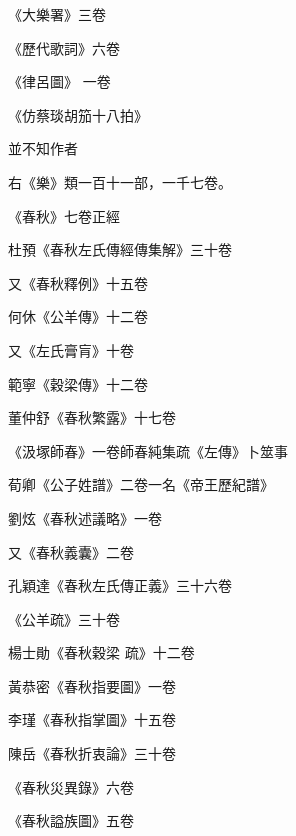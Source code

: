 \begin{pinyinscope}
 《大樂署》三卷



 《歷代歌詞》六卷



 《律呂圖》
 一卷



 《仿蔡琰胡笳十八拍》



 並不知作者



 右《樂》類一百十一部，一千七卷。



 《春秋》七卷正經



 杜預《春秋左氏傳經傳集解》三十卷



 又《春秋釋例》十五卷



 何休《公羊傳》十二卷



 又《左氏膏肓》十卷



 範寧《穀梁傳》十二卷



 董仲舒《春秋繁露》十七卷



 《汲塚師春》一卷師春純集疏《左傳》卜筮事



 荀卿《公子姓譜》二卷一名《帝王歷紀譜》



 劉炫《春秋述議略》一卷



 又《春秋義囊》二卷



 孔穎達《春秋左氏傳正義》三十六卷



 《公羊疏》三十卷



 楊士勛《春秋穀梁
 疏》十二卷



 黃恭密《春秋指要圖》一卷



 李瑾《春秋指掌圖》十五卷



 陳岳《春秋折衷論》三十卷



 《春秋災異錄》六卷



 《春秋謚族圖》五卷




\end{pinyinscope}
